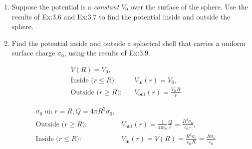 \begin{hwkProblem}{3.18}{}

	\begin{enumerate}
		\item Suppose the potential is a \textit{constant} \( V_{0} \) over the surface of the sphere. Use the results of Ex:3.6 and Ex:3.7 to find the potential inside and outside the sphere.
		\item Find the potential inside and outside a spherical shell that carries a uniform surface charge \( \sigma_{0} \), using the results of Ex:3.9.
	\end{enumerate}

	\hwkSol{}

	\hwkPart{}
	\begin{align*}
		V(R) = V_0, \\
		\text{Inside (\(r\le R\)):} \quad &V_{\text{in}}(r)=V_0, \\
		\text{Outside (\(r\ge R\)):} \quad &V_{\text{out}}(r)=\frac{V_0\,R}{r}
	\end{align*}

	\hwkPart{}
	\begin{align*}
		\sigma_0\text{ on }r=R, Q=4\pi R^2\sigma_0, \\
		\text{Outside (\(r\ge R\)):} \quad &V_{\text{out}}(r)=\frac{1}{4\pi\epsilon_0}\frac{Q}{r}=\frac{R^2\sigma_0}{\epsilon_0\,r}, \\
		\text{Inside (\(r\le R\)):} \quad &V_{\text{in}}(r)=V(R)=\frac{R^2\sigma_0}{\epsilon_0\,R}=\frac{R\sigma_0}{\epsilon_0}
	\end{align*}

\end{hwkProblem}
